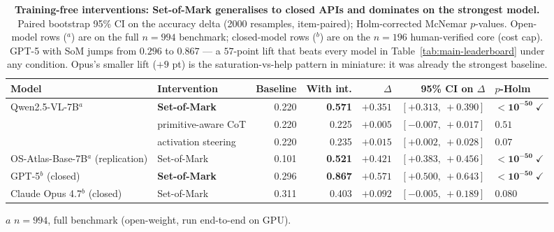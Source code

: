 \begin{table}[t]
\centering
\small
\begin{threeparttable}
\caption{\textbf{Training-free interventions: Set-of-Mark
generalises to closed APIs and dominates on the strongest model.}
Paired bootstrap 95\% CI on the accuracy delta (2000 resamples,
item-paired); Holm-corrected McNemar $p$-values. Open-model rows
($^a$) are on the full $n{=}994$ benchmark; closed-model rows ($^b$)
are on the $n{=}196$ human-verified core (cost cap). GPT-5 with
SoM jumps from $0.296$ to $0.867$ --- a $57$-point lift that beats
every model in Table~\ref{tab:main-leaderboard} under any condition.
Opus's smaller lift ($+9$ pt) is the saturation-vs-help pattern in
miniature: it was already the strongest baseline.}
\label{tab:interventions}
\begin{tabular}{@{}llrrrrl@{}}
\toprule
\textbf{Model} & \textbf{Intervention} & \textbf{Baseline} & \textbf{With int.}
& \textbf{$\Delta$} & \textbf{95\% CI on $\Delta$} & \textbf{$p$-Holm} \\
\midrule
\multirow{3}{*}{Qwen2.5-VL-7B$^a$} & \textbf{Set-of-Mark}    & 0.220 & \textbf{0.571}
& \textbf{$+0.351$} & $[+0.313,\ +0.390]$ & $\mathbf{< 10^{-50}}\;\checkmark$ \\
                              & primitive-aware CoT          & 0.220 & 0.225 & $+0.005$ & $[-0.007,\ +0.017]$ & $0.51$ \\
                              & activation steering          & 0.220 & 0.235 & $+0.015$ & $[+0.002,\ +0.028]$ & $0.07$ \\
\midrule
OS-Atlas-Base-7B$^a$ (replication) & Set-of-Mark              & 0.101 & \textbf{0.521}
& \textbf{$+0.421$} & $[+0.383,\ +0.456]$ & $\mathbf{< 10^{-50}}\;\checkmark$ \\
\midrule
GPT-5$^b$ (closed)               & \textbf{Set-of-Mark}         & 0.296 & \textbf{0.867}
& \textbf{$+0.571$} & $[+0.500,\ +0.643]$ & $\mathbf{< 10^{-50}}\;\checkmark$ \\
Claude Opus 4.7$^b$ (closed)     & Set-of-Mark                  & 0.311 & 0.403
& $+0.092$ & $[-0.005,\ +0.189]$ & $0.080$ \\
\bottomrule
\end{tabular}
\begin{tablenotes}
\footnotesize
\item[$a$] $n{=}994$, full benchmark (open-weight, run end-to-end on GPU).

\end{tablenotes}
\end{threeparttable}
\end{table}
